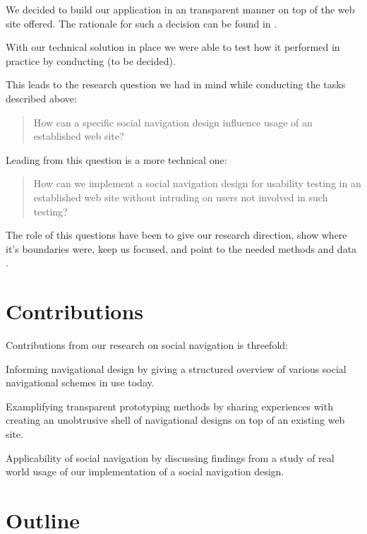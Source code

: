 We decided to build our application in an transparent manner on top of the
web site \urort{} offered. The rationale for such a decision can be found in
.

With our technical solution in place we were able to test how it performed in
practice by conducting  (to be decided).

This leads to the research question we had in mind while conducting
the tasks described above:

\begin{quote}
  How can a specific social navigation design influence usage of
  an established web site?
\end{quote}

Leading from this question is a more technical one:

\begin{quote}
  How can we implement a social navigation design for
  usability testing in an established web site without
  intruding on users not involved in such testing?
\end{quote}

The role of this questions have been to give our research direction, show
where it's boundaries were, keep us focused, and point to the needed methods
and data \citep[p.~77]{silverman05}.


\section{Contributions}

Contributions from our research on social navigation is threefold:

\begin{enum}
  \item Informing navigational design by giving a structured overview of
    various social navigational schemes in use today.
  \item Examplifying transparent prototyping methods by sharing experiences
    with creating an unobtrusive shell of navigational designs on top of an
    existing web site.
  \item Applicability of social navigation by discussing findings from
    a study of real world usage of our implementation of a social navigation
    design.
\end{enum}

\section{Outline}


